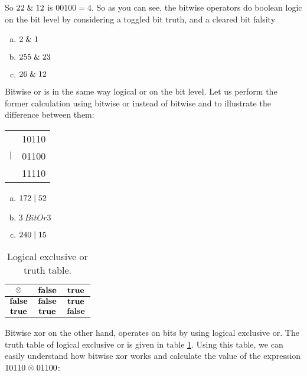 So $22 \mathrel{\&} 12$ is $00100=4$. So as you can see, the bitwise
operators do boolean logic on the bit level by considering a toggled
bit truth, and a cleared bit falsity

\begin{Exercise}[label={bitand}]
  \begin{enumerate}[(a)]
  \item $2 \mathrel{\&} 1$
  \item $255 \mathrel{\&} 23$
  \item $26 \mathrel{\&} 12$
  \end{enumerate}
\end{Exercise}

Bitwise or is in the same way logical or on the bit level. Let us
perform the former calculation using bitwise or instead of bitwise and
to illustrate the difference between them:

\begin{center}
  \begin{tabular}{lr}
    & 10110  \\
    $\mathrel{|}$ & 01100 \\
    \hline
    & 11110 \\
  \end{tabular}
\end{center}

\begin{Exercise}[label={bitor}]
  \begin{enumerate}[(a)]
  \item $172 \mathrel{|} 52$
  \item $3 \ BitOr 3$
  \item $240 \mathrel{|} 15$
  \end{enumerate}
\end{Exercise}

\begin{table}
  \centering
  \begin{tabular}{|c|c|c|}
    \hline
    $\mathbf{\mathrel{\otimes}}$ & $\mathbf{\textbf{false}}$ & $\mathbf{\textbf{true}}$ \\ \hline
    $\mathbf{\textbf{false}}$ & $\mathbf{\textbf{false}}$ & $\mathbf{\textbf{true}}$ \\ \hline
    $\mathbf{\textbf{true}}$ & $\mathbf{\textbf{true}}$ & $\mathbf{\textbf{false}}$ \\ \hline
  \end{tabular}
  \caption{Logical exclusive or truth table.}
  \label{tab:log-exlusive-or-table}
\end{table}

Bitwise xor on the other hand, operates on bits by using logical
exclusive or. The truth table of logical exclusive or is given in
table \ref{tab:log-exlusive-or-table}. Using this table, we can easily
understand how bitwise xor works and calculate the value of the
expression $10110 \mathrel{\otimes} 01100$:

